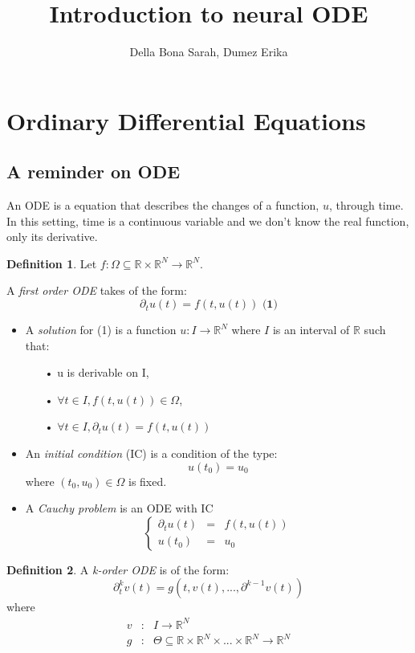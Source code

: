 \documentclass[10pt,a4paper]{article}
\author{Della Bona Sarah, Dumez Erika}
\title{Introduction to neural ODE}
\theoremstyle{definition}
\newtheorem{definition}{Definition}
\theoremstyle{definition}
\begin{document}
\maketitle
 
\section{Ordinary Differential Equations}

\subsection{A reminder on ODE}

An ODE is a equation that describes the changes of a function, $u$, through time. In this setting, time is a continuous variable and we don't know the real function, only its derivative.

\begin{definition}
Let $f: \Omega \subseteq \mathbb{R} \times \mathbb{R}^N \rightarrow \mathbb{R}^N$. 

A \textit{first order ODE} takes of the form:
\[
\partial_t u(t) = f(t,u(t)) \textbf{   (1)}
\]

\begin{itemize}
\item A \textit{solution} for (1) is a function $u : I \rightarrow \mathbb{R}^N$ where $I$ is an interval of $\mathbb{R}$ such that:
	\begin{itemize}
	\item[•] u is derivable on I,
	\item[•] $\forall t \in I, f(t, u(t)) \in \Omega$,
	\item[•] $\forall t \in I, \partial_t u(t) = f(t, u(t))$
	\end{itemize}
\item An \textit{initial condition} (IC) is a condition of the type:
\[
u(t_0) = u_0
\]
where $(t_0, u_0) \in \Omega$ is fixed.

\item A \textit{Cauchy problem} is an ODE with IC
\[
\left \{
\begin{array}{rcl}
\partial_t u(t) & = & f(t, u(t)) \\
u(t_0) & = & u_0
\end{array}
\right.
\]
\end{itemize}
\end{definition}

\begin{definition}
A \textit{k-order ODE} is of the form:
\[
\partial^k_t v(t) = g(t, v(t), ... , \partial^{k-1}v(t))
\]
where 
   \begin{eqnarray}
   \nonumber
   v & : & I \rightarrow \mathbb{R}^N \\ 
   \nonumber
   g & : & \Theta \subseteq \mathbb{R} \times \mathbb{R}^N \times ... \times \mathbb{R}^N \rightarrow \mathbb{R}^N
   \end{eqnarray}
\end{definition}
\end{document}
